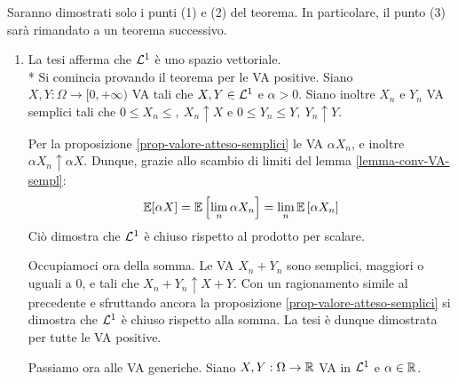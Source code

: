 \bigskip
\begin{dimo}
  Saranno dimostrati solo i punti (1) e (2) del teorema.
  In particolare, il punto (3) sarà rimandato a un teorema successivo.
  \begin{enumerate}
  \item La tesi afferma che $\mathcal L^1$ è uno spazio vettoriale. \\*
  Si comincia provando il teorema per le VA positive.
  Siano $X, Y: \Omega \to [0, +\infty)$ VA tali che $X,Y \in \mathcal L^1$ e $\alpha > 0$. 
  Siano inoltre $X_n$ e $Y_n$ VA semplici tali che $0 \le X_n \le, \ X_n \uparrow X$ e $0 \le Y_n \le Y, \ Y_n \uparrow Y$.

  Per la proposizione \ref{prop-valore-atteso-semplici} le VA $\alpha X_n$, e inoltre $\alpha X_n \uparrow \alpha X$. Dunque, grazie allo scambio di limiti del lemma \ref{lemma-conv-VA-sempl}:
  $$\mathbb E[\alpha X] = \mathbb E \left[ \lim\limits_n \alpha X_n \right]
    = \lim\limits_n \mathbb E \left[ \alpha X_n \right]$$
  Ciò dimostra che $\mathcal L^1$ è chiuso rispetto al prodotto per scalare.

  Occupiamoci ora della somma. Le VA $X_n + Y_n$ sono semplici, maggiori o uguali a 0, e tali che $X_n + Y_n \uparrow X + Y$.
  Con un ragionamento simile al precedente e sfruttando ancora la proposizione \ref{prop-valore-atteso-semplici} si dimostra che $\mathcal L^1$ è chiuso rispetto alla somma.
  La tesi è dunque dimostrata per tutte le VA positive.

  Passiamo ora alle VA generiche.
  Siano $X, Y: \Omega \to \mathbb R$ VA in $\mathcal L^1$ e $\alpha \in \mathbb R$.


\end{enumerate}
\end{dimo}
